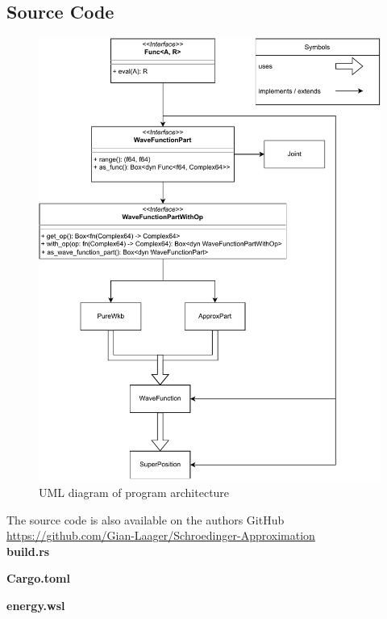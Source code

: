 \documentclass[11pt,DIV=10,final]{scrreprt} %
\begin{document}
\begin{appendix}
{\chapter{Source Code}
\begin{figure}[H]\label{fig:uml-arch}
  \centering
  \includegraphics[width=\textwidth]{program_architecture.pdf}
  \caption{UML diagram of program architecture}
\end{figure}

The source code is also available on the authors GitHub \\
\url{https://github.com/Gian-Laager/Schroedinger-Approximation}\\[3ex]
\vspace*{3ex}
{\noindent \large \bfseries build.rs}


\vspace*{3ex}
{\noindent \large \bfseries Cargo.toml}


\vspace*{3ex}
{\noindent \large \bfseries energy.wsl}


}
\end{appendix}
\end{document}
